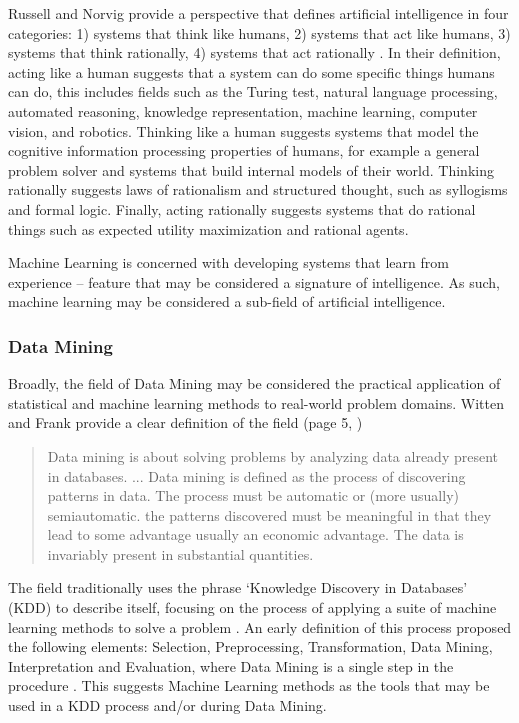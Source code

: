 \documentclass[a4paper, 11pt]{article}
\begin{document}
Russell and Norvig provide a perspective that defines artificial intelligence in four categories: 1) systems that think like humans, 2) systems that act like humans, 3) systems that think rationally, 4) systems that act rationally \cite{Russell2009}. In their definition, acting like a human suggests that a system can do some specific things humans can do, this includes fields such as the Turing test, natural language processing, automated reasoning, knowledge representation, machine learning, computer vision, and robotics. Thinking like a human suggests systems that model the cognitive information processing properties of humans, for example a general problem solver and systems that build internal models of their world. Thinking rationally suggests laws of rationalism and structured thought, such as syllogisms and formal logic. Finally, acting rationally suggests systems that do rational things such as expected utility maximization and rational agents. 

Machine Learning is concerned with developing systems that learn from experience -- feature that may be considered a signature of intelligence. As such, machine learning may be considered a sub-field of artificial intelligence.

\subsubsection{Data Mining}
Broadly, the field of Data Mining may be considered the practical application of statistical and machine learning methods to real-world problem domains. 
Witten and Frank provide a clear definition of the field (page 5, \cite{Witten2000})

\begin{quotation}
Data mining is about solving problems by analyzing data already present in databases. ... Data mining is defined as the process of discovering patterns in data. The process must be automatic or (more usually) semiautomatic. the patterns discovered must be meaningful in that they lead to some advantage usually an economic advantage. The data is invariably present in substantial quantities.
\end{quotation}

The field traditionally uses the phrase `Knowledge Discovery in Databases' (KDD) to describe itself, focusing on the process of applying a suite of machine learning methods to solve a problem \cite{Frawley1992}. An early definition of this process proposed the following elements: Selection, Preprocessing, Transformation, Data Mining, Interpretation and Evaluation, where Data Mining is a single step in the procedure \cite{Fayyad1996a}.
This suggests Machine Learning methods as the tools that may be used in a KDD process and/or during Data Mining.
\end{document}
